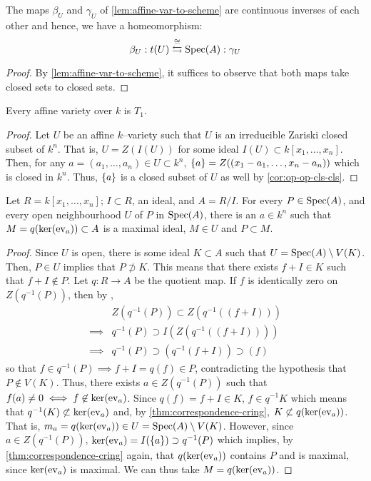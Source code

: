 \begin{cor}\label{cor:schemat-affine-var-homeo}
The maps $\beta_U$ and $\gamma_U$ of \cref{lem:affine-var-to-scheme}
are continuous inverses of each other and hence, we have a homeomorphism:
\[
\beta_U : t(U) \stackrel{\cong}{\leftrightarrows} \mathrm{Spec}(A) : \gamma_U
\]
\end{cor}
\begin{proof}
By \cref{lem:affine-var-to-scheme}, it suffices to observe that
both maps take closed sets to closed sets.
\end{proof}

\begin{lem}\label{lem:affine-var-T1}
Every affine variety over $k$ is $T_1$.
\end{lem}
\begin{proof}
Let $U$ be an affine $k$--variety such that $U$ is an irreducible
Zariski closed subset of $k^n$. That is, $U = Z(I(U))$ for some
ideal $I(U) \subset k[x_1, \dots, x_n]$. Then, for any
$a = (a_1, \dots, a_n) \in U \subset k^n$,
$\set{a} = Z((x_1 - a_1, \dots, x_n - a_n))$ which is closed
in $k^n$.
Thus, $\set{a}$ is a closed subset of $U$ as well by \cref{cor:op-op-cls-cls}.
\end{proof}

\begin{lem}\label{lem:max-neighbour}
Let $R = k[x_1, \dots, x_n]$; $I \subset R$, an ideal, and $A = R/I$.
For every $P \in \mathrm{Spec}(A)$, and every
open neighbourhood $U$ of $P$ in $\mathrm{Spec}(A)$,
there is an $a \in k^n$ such that $M = q(\ker{\ev_a}) \subset A$ is a
maximal ideal, $M \in U$ and $P \subset M$.
\end{lem}
\begin{proof}
Since $U$ is open, there is some ideal $K \subset A$ such that
$U = \mathrm{Spec}(A) \setminus V(K)$. Then, $P \in U$ implies that
$P \not\supset K$. This means that there exists $f + I \in K$ such that
$f + I \not\in P$.
Let $q : R \to A$ be the quotient map.
If $f$ is identically zero on $Z(q^{-1}(P))$, then by
\cite[Cor. I.1.4]{HartAG},
\begin{align*}
        & Z(q^{-1}(P)) \subset Z(q^{-1}((f + I))) \\
\implies& q^{-1}(P) \supset I(Z(q^{-1}((f + I)))) \\
\implies& q^{-1}(P) \supset (q^{-1}(f + I)) \supset (f)
\end{align*}
so that $f \in q^{-1}(P) \implies f + I = q(f) \in P$, contradicting
the hypothesis that $P \not\in V(K)$. Thus, there exists $a \in Z(q^{-1}(P))$
such that $f(a) \neq 0 \iff f \not\in \ker{\ev_a}$. Since $q(f) = f + I \in K$,
$f \in q^{-1}K$ which means that
$q^{-1}(K) \not\subset \ker{\ev_a}$ and, by \cref{thm:correspondence-cring},
$K \not\subset q(\ker{\ev_a})$. That is,
$m_a = q(\ker{\ev_a}) \in U = \Spec(A) \setminus V(K)$.
However, since $a \in Z(q^{-1}(P))$,
$\ker{\ev_a} = I(\set{a}) \supset q^{-1}(P)$ which implies, by
\cref{thm:correspondence-cring} again, that $q(\ker{\ev_a})$ contains
$P$ and is maximal, since $\ker{\ev_a}$ is maximal. We can thus
take $M = q(\ker{\ev_a})$.
\end{proof}

